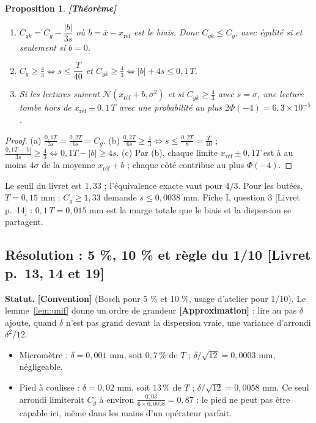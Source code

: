 \documentclass[11pt,a4paper]{article}
\theoremstyle{tq}
\newtheorem{prop}{Proposition}
\theoremstyle{remark}
\newcommand{\thm}{\textcolor{vertTQ}{\textbf{[Théorème]}}}
\newcommand{\conv}{\textcolor{orangeTQ}{\textbf{[Convention]}}}
\newcommand{\appr}{\textcolor{uimmred}{\textbf{[Approximation]}}}
\newcommand{\liv}[1]{\textcolor{uimmblue}{\small[Livret p.~#1]}}
\newcommand{\N}{\mathcal{N}}
\begin{document}
\begin{prop}\thm{}
\begin{enumerate}[nosep,label=(\alph*)]
\item $C_{gk}=C_g-\dfrac{|b|}{3s}$ où $b=\bar x-x_{\text{réf}}$ est le biais. Donc $C_{gk}\le C_g$, avec égalité si et seulement si $b=0$.
\item $C_g\ge\frac43\iff s\le\dfrac{T}{40}$ \quad et \quad $C_{gk}\ge\frac43\iff|b|+4s\le0{,}1\,T$.
\item Si les lectures suivent $\N(x_{\text{réf}}+b,\sigma^2)$ et si $C_{gk}\ge\frac43$ avec $s=\sigma$, une lecture tombe hors de $x_{\text{réf}}\pm0{,}1\,T$ avec une probabilité au plus $2\Phi(-4)=6{,}3\times10^{-5}$.
\end{enumerate}
\end{prop}
\begin{proof}
(a) $\frac{0{,}1T}{3s}=\frac{0{,}2T}{6s}=C_g$. (b) $\frac{0{,}2T}{6s}\ge\frac43\iff s\le\frac{0{,}2T}{8}=\frac{T}{40}$ ; $\frac{0{,}1T-|b|}{3s}\ge\frac43\iff0{,}1T-|b|\ge4s$. (c) Par (b), chaque limite $x_{\text{réf}}\pm0{,}1T$ est à au moins $4\sigma$ de la moyenne $x_{\text{réf}}+b$ ; chaque côté contribue au plus $\Phi(-4)$.
\end{proof}
Le seuil du livret est $1{,}33$ ; l'équivalence exacte vaut pour $4/3$. Pour les butées, $T=0{,}15$ mm : $C_g\ge1{,}33$ demande $s\le0{,}0038$ mm. Fiche I, question 3 \liv{14} : $0{,}1\,T=0{,}015$ mm est la marge totale que le biais et la dispersion se partagent.

\subsection{Résolution : 5 \%, 10 \% et règle du 1/10 \liv{13, 14 et 19}}
\textbf{Statut.} \conv{} (Bosch pour 5 \% et 10 \%, usage d'atelier pour 1/10). Le lemme~\ref{lem:unif} donne un ordre de grandeur \appr{} : lire au pas $\delta$ ajoute, quand $\delta$ n'est pas grand devant la dispersion vraie, une variance d'arrondi $\delta^2/12$.
\begin{itemize}[nosep,leftmargin=1.2em]
\item Micromètre : $\delta=0{,}001$ mm, soit $0{,}7\,\%$ de $T$ ; $\delta/\sqrt{12}=0{,}0003$ mm, négligeable.
\item Pied à coulisse : $\delta=0{,}02$ mm, soit $13\,\%$ de $T$ ; $\delta/\sqrt{12}=0{,}0058$ mm. Ce seul arrondi limiterait $C_g$ à environ $\frac{0{,}03}{6\times0{,}0058}=0{,}87$ : le pied ne peut pas être capable ici, même dans les mains d'un opérateur parfait.
\end{itemize}
\end{document}
